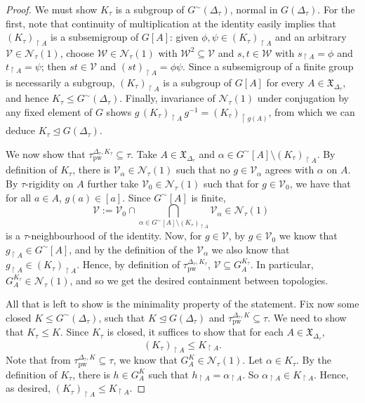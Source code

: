 \documentclass{article}
\theoremstyle{remark}
\theoremstyle{definition}
\newcommand{\V}[0]{\mathcal{V}}
\newcommand{\W}[0]{\mathcal{W}}
\newcommand{\pw}[0]{\tau_{\mathrm{pw}}}
\newcommand{\X}[0]{\mathfrak{X}}
\renewcommand\leq{\leqslant}
\newcommand{\gc}[0]{G^{\sim}}
\begin{document}
{{{{{\begin{proof}
{      We must show $K_\tau$ is a subgroup of $\gc(\Delta_\tau)$, normal in $G(\Delta_\tau)$. 
      For the first, note that continuity of multiplication at the identity easily implies that $(K_{\tau})_{\upharpoonright A}$ is a subsemigroup of $G[A]$: given $\phi, \psi \in (K_\tau)_{\upharpoonright A}$ and an arbitrary $\V \in \mathcal{N}_\tau(1)$, choose
      $\W \in \mathcal{N}_\tau(1)$ with $\W^2 \subseteq \V$ and $s, t \in \W$  with $s_{\restriction A} = \phi$ and $t_{\restriction A} = \psi$; then $st \in \V$ and $(st)_{\restriction A} = \phi \psi$. Since a subsemigroup of a finite group is necessarily a subgroup,  $(K_{\tau})_{\upharpoonright A}$ is a subgroup of $G[A]$ for every $A\in \X_{\Delta_{\tau}}$, and hence $K_{\tau}\leq {\gc(\Delta_{\tau})}$.
    Finally, invariance of   $\mathcal{N}_\tau(1)$ under conjugation by any fixed element of $G$
   shows $g\, (K_\tau)_{\upharpoonright A}\, g^{-1} = (K_\tau)_{\upharpoonright g(A)}$, from which we can deduce $K_\tau\unlhd G(\Delta_\tau)$.
   }
 
   { 
      We now show that $\pw^{\Delta_{\tau},K_{\tau}}\subseteq \tau$.
      Take 
     $A\in\X_{\Delta_{\tau}}$ and $\alpha\in \gc[A]\setminus (K_{\tau})_{\upharpoonright A}$. By definition of $K_\tau$, there is $\V_\alpha\in\mathcal{N}_\tau(1)$ such that no $g\in\V_\alpha$ agrees with $\alpha$ on $A$. By $\tau$-rigidity on $A$ further take $\V_0\in\mathcal{N}_\tau(1)$ such that for $g\in\V_0$, we have that for all $a\in A$, $g(a)\in[a]$.  Since $\gc[A]$ is finite,} 
     \[\V:={\V_0\cap}\bigcap_{\alpha\in{\gc[A]\setminus (K_{\tau})_{\upharpoonright A}}} \V_\alpha\in\mathcal{N}_\tau(1)\;\]
     {is a $\tau$-neighbourhood of the identity. Now, for $g\in\V$, by $g\in\V_0$ we know that $g_{\upharpoonright A}\in \gc[A]$, and by the definition of the $\V_\alpha$ we also know that $g_{\upharpoonright A}\in (K_\tau)_{\upharpoonright A}$. Hence, by definition of $\pw^{\Delta_\tau, K_\tau}$, $\V\subseteq G_A^{K_\tau}$. In particular, $G_A^{K_\tau}\in \mathcal{N}_\tau(1)$, and so we get the desired containment between topologies.}
     
 
      
      All that is left to show is the minimality property of the statement. 
      Fix now some closed $K\leq {\gc(\Delta_{\tau})}$, such that $K\unlhd G(\Delta_{\tau})$ and $\pw^{\Delta_{\tau},K}\subseteq\tau$.
      We need to show that $K_{\tau}\leq K$. Since $K_{\tau}$ is closed, it suffices to show that {for each $A\in\X_{\Delta_{\tau}}$,}
      \begin{equation*}
        (K_{\tau})_{\upharpoonright A}\leq K_{\upharpoonright A}.
      \end{equation*}
      {Note that from $\pw^{\Delta_{\tau},K}\subseteq\tau$, we know that $G_A^K\in\mathcal{N}_\tau(1)$. Let $\alpha\in K_\tau$. By the definition of $K_\tau$, there is $h\in G_A^K$ such that $h_{\upharpoonright A}=\alpha_{\upharpoonright A}$. So $\alpha_{\upharpoonright A}\in K_{\upharpoonright A}$. Hence, as desired, $(K_{\tau})_{\upharpoonright A}\leq K_{\upharpoonright A}$.}
  \end{proof}


}}}}}
\end{document}
